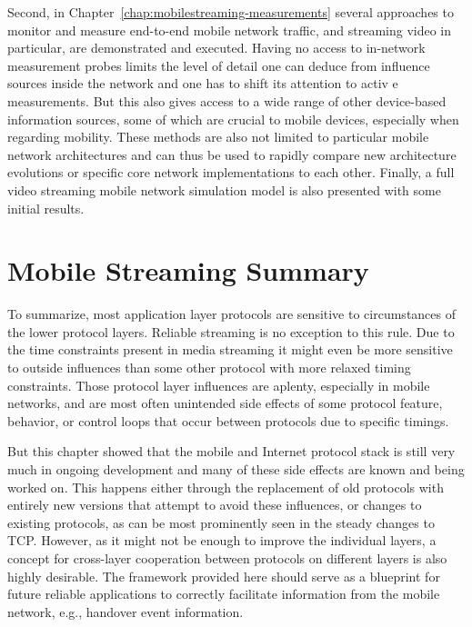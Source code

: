 Second, in Chapter~\ref{chap:mobilestreaming-measurements} several approaches to monitor and measure end-to-end mobile network traffic, and streaming video in particular, are demonstrated and executed. Having no access to in-network measurement probes limits the level of detail one can deduce from influence sources inside the network and one has to shift its attention to activ e measurements. But this also gives access to a wide range of other device-based information sources, some of which are crucial to mobile devices, especially when regarding mobility. These methods are also not limited to particular mobile network architectures and can thus be used to rapidly compare new architecture evolutions or specific core network implementations to each other. Finally, a full video streaming mobile network simulation model is also presented with some initial results.








\section{Mobile Streaming Summary}

To summarize, most application layer protocols are sensitive to circumstances of the lower protocol layers. Reliable streaming is no exception to this rule. Due to the time constraints present in media streaming it might even be more sensitive to outside influences than some other protocol with more relaxed timing constraints. Those protocol layer influences are aplenty, especially in mobile networks, and are most often unintended side effects of some protocol feature, behavior, or control loops that occur between protocols due to specific timings.

But this chapter showed that the mobile and Internet protocol stack is still very much in ongoing development and many of these side effects are known and being worked on. This happens either through the replacement of old protocols with entirely new versions that attempt to avoid these influences, or changes to existing protocols, as can be most prominently seen in the steady changes to \gls{TCP}. However, as it might not be enough to improve the individual layers, a concept for cross-layer cooperation between protocols on different layers is also highly desirable. The framework provided here should serve as a blueprint for future reliable applications to correctly facilitate information from the mobile network, e.g., handover event information.



